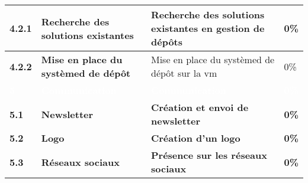 \begin{supertabular}{|p{2.2cm} p{6cm}|p{5cm}|R{2cm}|}
  \hspace{6pt}
  \textbf{4.2.1}  & \textbf{Recherche des solutions existantes} & Recherche des solutions existantes en gestion de dépôts & 0\% \\
  \hline

  \hspace{6pt}
  \textbf{4.2.2}  & \textbf{Mise en place du systèmed de dépôt} &  Mise en place du systèmed de dépôt sur la vm & 0\% \\
  \hline


  \textcolor{white}{\textbf{5}}  & \textcolor{white}{\textbf{Communication}} & \textcolor{white}{\textbf{Communication}} & \textcolor{white}{\textbf{0\%}} \\
  \hline

  \textbf{5.1}  & \textbf{Newsletter} & \textbf{Création et envoi de newsletter} & \textbf{0\%} \\
  \hline

  \textbf{5.2}  & \textbf{Logo} & \textbf{Création d'un logo} & \textbf{0\%} \\
  \hline

  \textbf{5.3}  & \textbf{Réseaux sociaux} & \textbf{Présence sur les réseaux sociaux} & \textbf{0\%} \\
  \hline



\end{supertabular}
\normalsize
